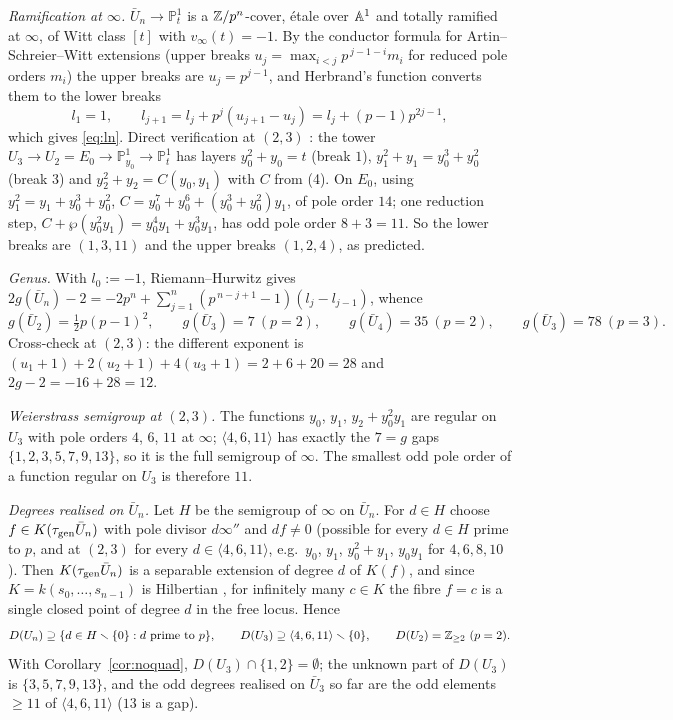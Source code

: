 \emph{Ramification at $\infty$.} $\bar U_n\to\mathbb P^1_t$ is a $\mathbb Z/p^n$-cover, \'etale
over $\mathbb A^1$ and totally ramified at $\infty$, of Witt class $[t]$ with $v_\infty(t)=-1$.
By the conductor formula for Artin--Schreier--Witt extensions \cite{Th} (upper breaks
$u_j=\max_{i<j}p^{\,j-1-i}m_i$ for reduced pole orders $m_i$) the upper breaks are
$u_j=p^{j-1}$, and Herbrand's function converts them to the lower breaks
\[
l_1=1,\qquad l_{j+1}=l_j+p^j(u_{j+1}-u_j)=l_j+(p-1)p^{2j-1},
\]
which gives \eqref{eq:ln}.  Direct verification at $(2,3)$ : the tower $U_3\to U_2=E_0\to\mathbb P^1_{y_0}\to\mathbb P^1_t$
has layers $y_0^2+y_0=t$ (break $1$), $y_1^2+y_1=y_0^3+y_0^2$ (break $3$) and
$y_2^2+y_2=C(y_0,y_1)$ with $C$ from (4). On $E_0$, using $y_1^2=y_1+y_0^3+y_0^2$,
$C=y_0^7+y_0^6+(y_0^3+y_0^2)y_1$, of pole order $14$; one reduction step,
$C+\wp(y_0^2y_1)=y_0^4y_1+y_0^3y_1$, has odd pole order $8+3=11$. So the lower breaks
are $(1,3,11)$ and the upper breaks $(1,2,4)$, as predicted.

\emph{Genus.} With $l_0:=-1$, Riemann--Hurwitz gives
$2g(\bar U_n)-2=-2p^n+\sum_{j=1}^n(p^{\,n-j+1}-1)(l_j-l_{j-1})$, whence
\[
g(\bar U_2)=\tfrac12p(p-1)^2,\qquad g(\bar U_3)=7\ (p=2),\qquad g(\bar U_4)=35\ (p=2),
\qquad g(\bar U_3)=78\ (p=3).
\]
Cross-check at $(2,3)$: the different exponent is $(u_1+1)+2(u_2+1)+4(u_3+1)=2+6+20=28$
and $2g-2=-16+28=12$. 

\emph{Weierstrass semigroup at $(2,3)$.} The functions $y_0$, $y_1$, $y_2+y_0^2y_1$ are
regular on $U_3$ with pole orders $4$, $6$, $11$ at $\infty$; $\langle4,6,11\rangle$ has
exactly the $7=g$ gaps $\{1,2,3,5,7,9,13\}$, so it is the full semigroup of $\infty$.
The smallest odd pole order of a function regular on $U_3$ is therefore $11$.

\emph{Degrees realised on $\bar U_n$.} Let $H$ be the semigroup of $\infty$ on
$\bar U_n$. For $d\in H$ choose $f\in K(\tau_{\mathrm{gen}}\bar U_n)$ with pole divisor $d\infty''$
and $df\ne0$ (possible for every $d\in H$ prime to $p$, and at $(2,3)$ for every
$d\in\langle4,6,11\rangle$, e.g.\ $y_0$, $y_1$, $y_0^2+y_1$, $y_0y_1$ for $4,6,8,10$).
Then $K(\tau_{\mathrm{gen}}\bar U_n)$ is a separable extension of degree $d$ of $K(f)$, and since
$K=k(s_0,\dots,s_{n-1})$ is Hilbertian \cite{FJ}, for infinitely many $c\in K$ the fibre
$f=c$ is a single closed point of degree $d$ in the free locus. Hence
\[
D(U_n)\supseteq\{d\in H\smallsetminus\{0\}:d\text{ prime to }p\},\qquad
D(U_3)\supseteq\langle4,6,11\rangle\smallsetminus\{0\},\qquad D(U_2)=\mathbb Z_{\ge2}\ (p=2).
\]
With Corollary~\ref{cor:noquad}, $D(U_3)\cap\{1,2\}=\emptyset$; the unknown part of
$D(U_3)$ is $\{3,5,7,9,13\}$, and the odd degrees realised on $\bar U_3$ so far are the
odd elements $\ge11$ of $\langle4,6,11\rangle$ ($13$ is a gap). 

